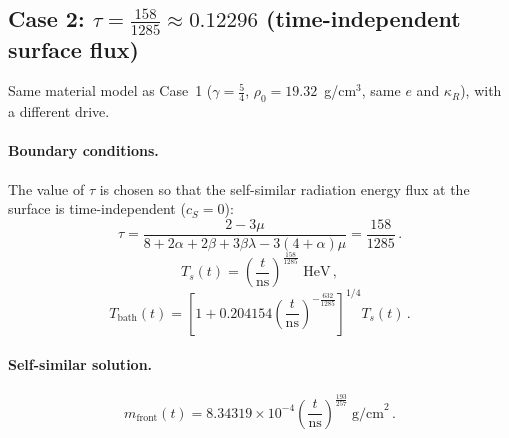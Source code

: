 \documentclass[11pt]{article}
\newcommand{\HeV}{\text{HeV}}
\begin{document}
\subsection*{Case 2: $\tau=\frac{158}{1285}\approx0.12296$ (time-independent surface flux)}

Same material model as Case~1
($\gamma=\frac{5}{4}$, $\rho_0=19.32$~g/cm$^3$,
same $e$ and $\kappa_R$),
with a different drive.

\paragraph{Boundary conditions.}
The value of $\tau$ is chosen so that the self-similar radiation
energy flux at the surface is time-independent ($c_S=0$):
\begin{equation}
  \tau
  = \frac{2-3\mu}{8+2\alpha+2\beta+3\beta\lambda-3(4+\alpha)\mu}
  = \frac{158}{1285}\,.
\end{equation}
\begin{equation}
  T_s(t)
  = \left(\frac{t}{\text{ns}}\right)^{\frac{158}{1285}}
  \;\HeV\,,
\end{equation}
\begin{equation}
  T_\text{bath}(t)
  = \left[
      1 + 0.204154\left(\frac{t}{\text{ns}}\right)^{-\frac{632}{1285}}
    \right]^{1/4}
  T_s(t)\,.
\end{equation}

\paragraph{Self-similar solution.}
\begin{equation}
  m_\text{front}(t)
  = 8.34319\times10^{-4}
    \left(\frac{t}{\text{ns}}\right)^{\frac{193}{257}}
  \;\text{g/cm}^2\,.
\end{equation}
\end{document}
